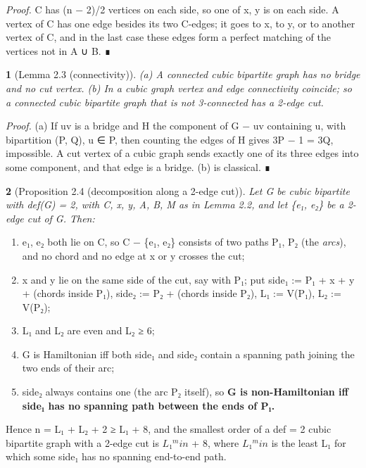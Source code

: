 \documentclass[11pt,a4paper]{article}
\theoremstyle{named}
\newtheorem*{namedthm}{}
\begin{document}
\textit{Proof.} C has (n − 2)/2 vertices on each side, so one of x, y is on each side. A vertex of C has one edge besides its two C-edges; it goes to x, to y, or to another vertex of C, and in the last case these edges form a perfect matching of the vertices not in A ∪ B. ∎

\begin{namedthm}[Lemma 2.3 (connectivity)]
(a) A connected cubic bipartite graph has no bridge and no cut vertex. (b) In a cubic graph vertex and edge connectivity coincide; so a connected cubic bipartite graph that is not 3-connected has a 2-edge cut.
\end{namedthm}

\textit{Proof.} (a) If uv is a bridge and H the component of G − uv containing u, with bipartition (P, Q), u ∈ P, then counting the edges of H gives 3\textbar{}P\textbar{} − 1 = 3\textbar{}Q\textbar{}, impossible. A cut vertex of a cubic graph sends exactly one of its three edges into some component, and that edge is a bridge. (b) is classical. ∎

\begin{namedthm}[Proposition 2.4 (decomposition along a 2-edge cut)]
Let G be cubic bipartite with def(G) = 2, with C, x, y, A, B, M as in Lemma 2.2, and let \{e₁, e₂\} be a 2-edge cut of G. Then:
\end{namedthm}

\begin{enumerate}
\item[1.] e₁, e₂ both lie on C, so C − \{e₁, e₂\} consists of two paths P₁, P₂ (the \textit{arcs}), and no chord and no edge at x or y crosses the cut;
\item[2.] x and y lie on the same side of the cut, say with P₁; put side₁ := P₁ + x + y + (chords inside P₁), side₂ := P₂ + (chords inside P₂), L₁ := \textbar{}V(P₁)\textbar{}, L₂ := \textbar{}V(P₂)\textbar{};
\item[3.] L₁ and L₂ are even and L₂ ≥ 6;
\item[4.] G is Hamiltonian iff both side₁ and side₂ contain a spanning path joining the two ends of their arc;
\item[5.] side₂ always contains one (the arc P₂ itself), so \textbf{G is non-Hamiltonian iff side₁ has no spanning path between the ends of P₁.}
\end{enumerate}
Hence n = L₁ + L₂ + 2 ≥ L₁ + 8, and the smallest order of a def = 2 cubic bipartite graph with a 2-edge cut is $L₁^min$ + 8, where $L₁^min$ is the least L₁ for which some side₁ has no spanning end-to-end path.
\end{document}
